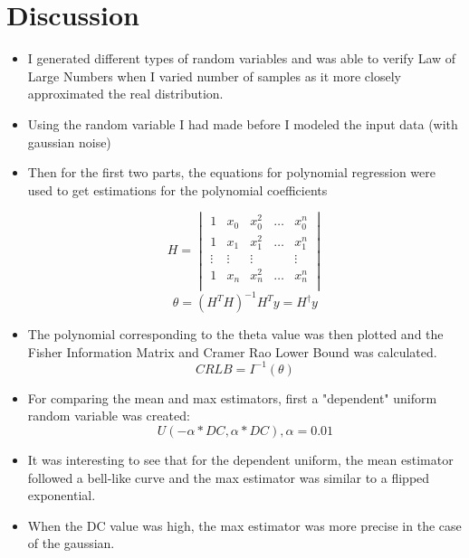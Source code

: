 \documentclass[12pt]{article}
\begin{document}
\section{Discussion}
\begin{itemize}
    \item I generated different types of random variables and was able to verify Law of Large Numbers when I varied number of samples as it more closely approximated the real distribution.
    \item Using the random variable I had made before I modeled the input data (with gaussian noise)
    \item Then for the first two parts, the equations for polynomial regression were used to get estimations for the polynomial coefficients
    
        \begin{equation*}
            H = \begin{vmatrix}
              1       & x_{0} & x_{0}^{2} & \dots & x_{0}^{n} \\ 
              1       & x_{1} & x_{1}^{2} & \dots & x_{1}^{n} \\
              \vdots  & \vdots&  \vdots   &       & \vdots    \\
              1       & x_{n} & x_{n}^{2} & \dots & x_{n}^{n} \\ 
            \end{vmatrix}
        \end{equation*}
        \newline
        \begin{equation*}
            \theta = (H^TH)^{-1}H^Ty = H^{\dag}y
        \end{equation*}

    \item The polynomial corresponding to the theta value was then plotted and the Fisher Information Matrix and Cramer Rao Lower Bound was calculated.
        \begin{equation*}
            CRLB = I^{-1}(\theta)
        \end{equation*}
    \item For comparing the mean and max estimators, first a "dependent" uniform random variable was created: 
    \begin{equation*}
        U(-\alpha*DC,\alpha*DC), \alpha=0.01
    \end{equation*}
    \item It was interesting to see that for the dependent uniform, the mean estimator followed a bell-like curve and the max estimator was similar to a flipped exponential.
    \item When the DC value was high, the max estimator was more precise in the case of the gaussian.
    
        
        

\end{itemize}



 
\end{document}
